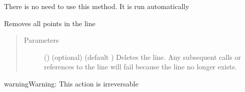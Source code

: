 \documentclass[letterpaper,10pt,english]{sphinxmanual}
\begin{document}
\begin{fulllineitems}


{\hyperref[\detokenize{pypoints:pypoints.VLine}]{}}



\begin{fulllineitems}
\label{\detokenize{pypoints:pypoints.HLine.build}}
There is no need to use this method. It is run automatically

\end{fulllineitems}


\begin{fulllineitems}
\label{\detokenize{pypoints:pypoints.HLine.remove}}
Removes all points in the line
\begin{quote}\begin{description}
\item[{Parameters}] \leavevmode
{} () \textendash{} (optional) (default ) Deletes the line. Any subsequent calls or references to the line will fail because the line no longer exists.

\end{description}\end{quote}

\begin{sphinxadmonition}{warning}{Warning:}
This action is irreversable
\end{sphinxadmonition}







\end{fulllineitems}


\end{fulllineitems}

\end{document}
